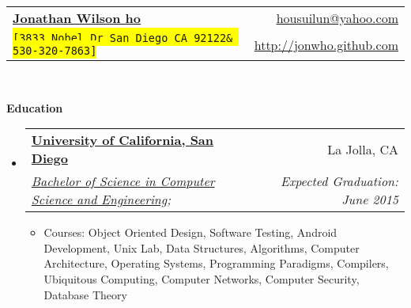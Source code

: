 \documentclass[letterpaper,11pt]{article}
\makeatletter
\newcommand{\resitem}[1]{\item #1 \vspace{-2pt}}
\newcommand{\resheading}[1]{{\large \colorbox{mygrey}{\begin{minipage}{\textwidth}{\textbf{#1 \vphantom{p\^{E}}}}\end{minipage}}}}
\newcommand{\ressubheading}[4]{
\begin{tabular*}{6.5in}{l@{\extracolsep{\fill}}r}
		\textbf{#1} & #2 \\
		\textit{#3} & \textit{#4} \\
\end{tabular*}\vspace{-6pt}}
\makeatother
\begin{document}
\newcommand{\mywebheader}{
\begin{tabular*}{7in}{l@{\extracolsep{\fill}}r}
	\textbf{\href{http://jonwho.github.com}{\LARGE Jonathan Wilson ho}} &
	\href{mailto:housuilun@yahoo.com}{housuilun@yahoo.com}\\
	{\footnotesize \texttt{\colorbox{yellow}{[3833 Nobel Dr San Diego CA 92122\&
						530-320-7863]}}} &
	\href{http://jonwho.github.com}{http://jonwho.github.com} \\
	\end{tabular*}
\\
\vspace{0.1in}}

\mywebheader

\resheading{Education}
  \begin{itemize}
    \item
      \ressubheading{\href{http://www.ucsd.edu}{University of California, San Diego}}{La Jolla, CA}{\href{http://www.cse.ucsd.edu}{Bachelor of Science in Computer Science and Engineering};}{Expected Graduation: June 2015}
      { \footnotesize
        \begin{itemize}
	  \resitem{Courses: Object Oriented Design, Software Testing, Android Development, Unix Lab, Data Structures, Algorithms, Computer Architecture, Operating Systems, Programming Paradigms, Compilers, Ubiquitous Computing, Computer Networks, Computer Security, Database Theory}
	\end{itemize}
      }
  \end{itemize} %
\end{document}
